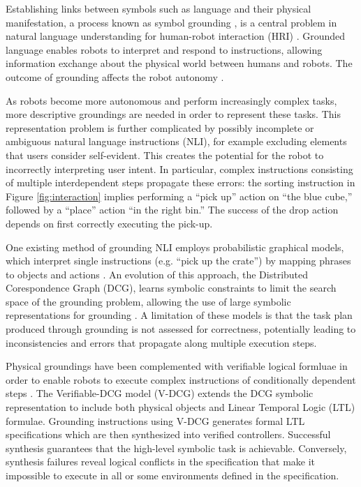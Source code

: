 \documentclass[letterpaper]{article} %
\begin{document}
Establishing links between symbols such as language and their physical manifestation, a process known as symbol grounding \cite{harnad1990symbol}, is a central problem in natural language understanding for human-robot interaction (HRI) \cite{stubbs2007autonomy,lemaignan2012grounding}. Grounded language enables robots to interpret and respond to instructions, allowing information exchange about the physical world between humans and robots. The outcome of grounding affects the robot autonomy \cite{goodrich2007human}. 

As robots become more autonomous and perform increasingly complex tasks, more descriptive groundings are needed in order to represent these tasks. This representation problem is further complicated by possibly incomplete or ambiguous natural language instructions (NLI), for example excluding elements that users consider self-evident. This creates the potential for the robot to incorrectly interpreting user intent. 
In particular, complex instructions consisting of multiple interdependent steps propagate these errors: the sorting instruction in Figure \ref{fig:interaction} implies performing a ``pick up'' action on ``the blue cube,'' followed by a ``place'' action ``in the right bin.'' The success of the drop action depends on first correctly executing the pick-up.

One existing method of grounding NLI employs probabilistic graphical models, which interpret single instructions (e.g. ``pick up the crate'') by mapping phrases to objects and actions \cite{tellex2011understanding}. An evolution of this approach, the Distributed Corespondence Graph (DCG), learns symbolic constraints to limit the search space of the grounding problem, allowing the use of large symbolic representations for grounding \cite{howard2014natural}. A limitation of these models is that the task plan produced through grounding is not assessed for correctness, potentially leading to inconsistencies and errors that propagate along multiple execution steps.

Physical groundings have been complemented with verifiable logical formluae in order to enable robots to execute complex instructions of conditionally dependent steps \cite{boteanu2016model}. The Verifiable-DCG model (V-DCG) extends the DCG symbolic representation to include both physical objects and Linear Temporal Logic (LTL) formulae. Grounding instructions using V-DCG generates formal LTL specifications which are then synthesized into verified controllers. Successful synthesis guarantees that the high-level symbolic task is achievable. Conversely, synthesis failures reveal logical conflicts in the specification that make it impossible to execute in all or some environments defined in the specification.
\end{document}
